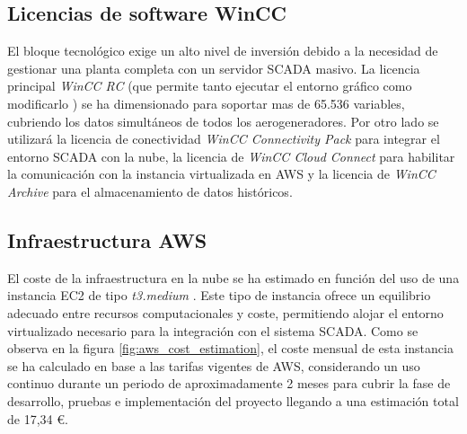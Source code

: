 \subsection{Licencias de software WinCC}
El bloque tecnológico exige un alto nivel de inversión debido a la necesidad de gestionar una planta completa con un servidor SCADA masivo. La licencia principal \textit{WinCC RC} (que permite tanto ejecutar el entorno gráfico como modificarlo ) se ha dimensionado para soportar mas de 65.536 variables, cubriendo los datos simultáneos de todos los aerogeneradores. Por otro lado se utilizará la licencia de conectividad \textit{WinCC Connectivity Pack} para integrar el entorno SCADA con la nube, la licencia de \textit{WinCC Cloud Connect} para habilitar la comunicación con la instancia virtualizada en \ac{AWS} y la licencia de \textit{WinCC Archive} para el almacenamiento de datos históricos.

\begin{table}[tbp]
\centering
\caption{Presupuesto desglosado de licencias WinCC e infraestructura local.}
\label{tab:presupuesto_licencias_desglosado}
\end{table}
\subsection{Infraestructura AWS}

El coste de la infraestructura en la nube se ha estimado en función del uso de una instancia EC2 de tipo \textit{t3.medium} . Este tipo de instancia ofrece un equilibrio adecuado entre recursos computacionales y coste, permitiendo alojar el entorno virtualizado necesario para la integración con el sistema SCADA. Como se observa en la figura \ref{fig:aws_cost_estimation}, el coste mensual de esta instancia se ha calculado en base a las tarifas vigentes de AWS, considerando un uso continuo durante un periodo de aproximadamente 2 meses para cubrir la fase de desarrollo, pruebas e implementación del proyecto llegando a una estimación total de 17,34 €. 

